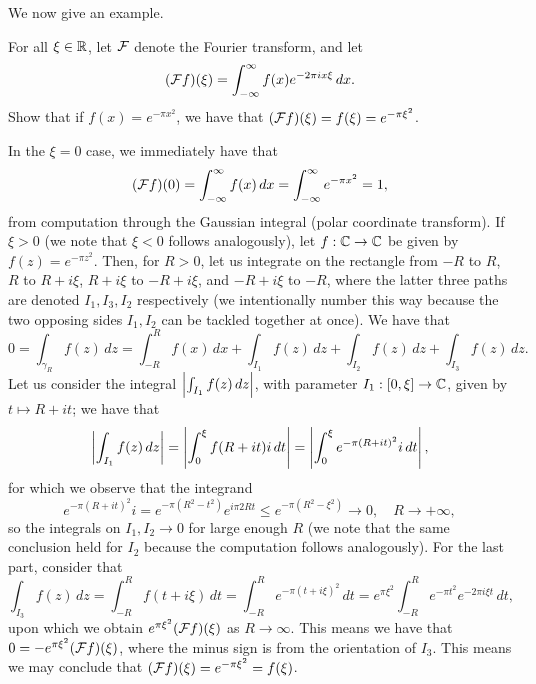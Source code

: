 \newpage
\noindent We now give an example.
\begin{problem}
    For all $\xi \in \mathbb R$, let $\mathcal F$ denote the Fourier transform, and let
    \[ (\mathcal F f)(\xi) = \int_{-\infty}^\infty f(x) e^{-2\pi i x \xi} \, dx. \]
    Show that if $f(x) = e^{-\pi x^2}$, we have that $(\mathcal F f)(\xi) = f(\xi) = e^{-\pi \xi^2}$.
\end{problem}
\begin{solution}
    In the $\xi = 0$ case, we immediately have that
    \[ (\mathcal F f)(0) = \int_{-\infty}^\infty f(x) \, dx = \int_{-\infty}^\infty e^{-\pi x^2} = 1, \]
    from computation through the Gaussian integral (polar coordinate transform). If $\xi > 0$ (we note that $\xi < 0$ follows analogously), let $f : \mathbb C \to \mathbb C$ be given by $f(z) = e^{-\pi z^2}$. Then, for $R > 0$, let us integrate on the rectangle from $-R$ to $R$, $R$ to $R + i\xi$, $R + i\xi$ to $-R + i\xi$, and $-R + i\xi$ to $-R$, where the latter three paths are denoted $I_1, I_3, I_2$ respectively (we intentionally number this way because the two opposing sides $I_1, I_2$ can be tackled together at once). We have that
    \[ 0 = \int_{\gamma_R} f(z) \, dz = \int_{-R}^R f(x) \, dx + \int_{I_1} f(z) \, dz + \int_{I_2} f(z) \, dz + \int_{I_3} f(z) \, dz. \]
    Let us consider the integral $\left\lvert \int_{I_1} f(z) \, dz \right\rvert$, with parameter $I_1 : [0, \xi] \to \mathbb C$, given by $t \mapsto R + it$; we have that
    \[ \left\lvert \int_{I_1} f(z) \, dz \right\rvert = \left\lvert \int_0^\xi f(R + it) i \, dt \right\rvert = \left\lvert \int_0^\xi e^{-\pi(R + it)^2} i \, dt \right\rvert, \]
    for which we observe that the integrand
    \[ e^{-\pi(R+it)^2} i = e^{-\pi(R^2 - t^2)} e^{i \pi 2 Rt} \leq e^{-\pi(R^2 - \xi^2)} \to 0, \quad R \to +\infty, \]
    so the integrals on $I_1, I_2 \to 0$ for large enough $R$ (we note that the same conclusion held for $I_2$ because the computation follows analogously). For the last part, consider that
    \[ \int_{I_3} f(z) \, dz = \int_{-R}^R f(t + i\xi) \, dt = \int_{-R}^R e^{-\pi(t + i\xi)^2} \, dt = e^{\pi \xi^2} \int_{-R}^R e^{-\pi t^2} e^{-2 \pi i \xi t} \, dt, \]
    upon which we obtain $e^{\pi \xi^2} (\mathcal F f)(\xi)$ as $R \to \infty$. This means we have that $0 = -e^{\pi \xi^2} (\mathcal F f)(\xi)$, where the minus sign is from the orientation of $I_3$. This means we may conclude that $(\mathcal F f)(\xi) = e^{-\pi \xi^2} = f(\xi)$.
\end{solution}
